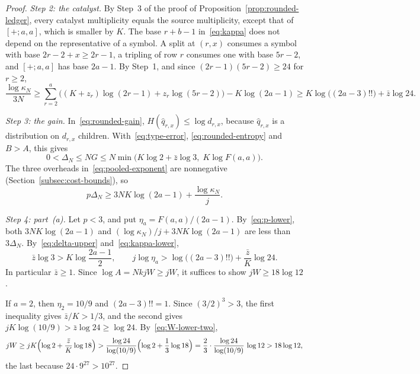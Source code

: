 \begin{proof}
\emph{Step 2: the catalyst.} By Step~3 of the proof of
Proposition~\ref{prop:rounded-ledger}, every catalyst multiplicity equals
the source multiplicity, except that of \([+;a,a]\), which is smaller by
\(K\). The base \(r+b-1\) in~\eqref{eq:kappa} does not depend on the
representative of a symbol. A split at \((r,x)\) consumes a symbol with
base \(2r-2+x\ge2r-1\), a tripling of row \(r\) consumes one with base
\(5r-2\), and \([+;a,a]\) has base \(2a-1\). By Step~1, and since
\((2r-1)(5r-2)\ge24\) for \(r\ge2\),
\begin{equation}\label{eq:kappa-lower}
 \frac{\log\kappa_N}{3N}
 \ge\sum_{r=2}^a\bigl((K+z_r)\log(2r-1)+z_r\log(5r-2)\bigr)-K\log(2a-1)
 \ge K\log\bigl((2a-3)!!\bigr)+\bar z\log24 .
\end{equation}

\emph{Step 3: the gain.} In~\eqref{eq:rounded-gain},
\(H(\hat q_{r,x})\le\log d_{r,x}\), because \(\hat q_{r,x}\) is a
distribution on \(d_{r,x}\) children. With~\eqref{eq:type-error},
\eqref{eq:rounded-entropy} and \(B>A\), this gives
\begin{equation}\label{eq:delta-upper}
 0<\Delta_N\le NG\le N\min\bigl(K\log2+\bar z\log3,\;K\log F(a,a)\bigr).
\end{equation}
The three overheads in~\eqref{eq:pooled-exponent} are nonnegative
(Section~\ref{subsec:cost-bounds}), so
\begin{equation}\label{eq:p-lower}
 p\Delta_N\ge3NK\log(2a-1)+\frac{\log\kappa_N}j .
\end{equation}

\emph{Step 4: part~(a).} Let \(p<3\), and put
\(\eta_a=F(a,a)/(2a-1)\). By~\eqref{eq:p-lower}, both
\(3NK\log(2a-1)\) and \((\log\kappa_N)/j+3NK\log(2a-1)\) are less than
\(3\Delta_N\). By~\eqref{eq:delta-upper} and~\eqref{eq:kappa-lower},
\begin{equation}\label{eq:subcubic-necessary}
 \bar z\log3>K\log\frac{2a-1}2,\qquad
 j\log\eta_a>\log\bigl((2a-3)!!\bigr)+\frac{\bar z}K\log24 .
\end{equation}
In particular \(\bar z\ge1\). Since \(\log A=NkjW\ge jW\), it suffices to
show \(jW\ge18\log12\).

If \(a=2\), then \(\eta_2=10/9\) and \((2a-3)!!=1\). Since
\((3/2)^3>3\), the first inequality gives \(\bar z/K>1/3\), and the
second gives \(jK\log(10/9)>\bar z\log24\ge\log24\).
By~\eqref{eq:W-lower-two},
\[
 jW\ge jK\Bigl(\log2+\frac{\bar z}K\log18\Bigr)
 >\frac{\log24}{\log(10/9)}\Bigl(\log2+\frac13\log18\Bigr)
 =\frac23\cdot\frac{\log24}{\log(10/9)}\,\log12>18\log12,
\]
the last because \(24\cdot9^{27}>10^{27}\).


\end{proof}

